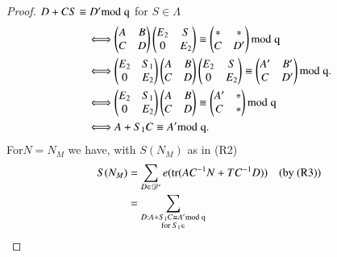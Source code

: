 \begin{proof}
$D+CS\equiv D'\rm{mod} \; q$ for $S\in\Lambda$
\begin{align*}
&\Longleftrightarrow 
\begin{pmatrix}
A & B\\
C & D
\end{pmatrix}
\begin{pmatrix}
E_{2} & S\\
0 & E_{2}
\end{pmatrix}
\equiv 
\begin{pmatrix}
\ast & \ast\\
C & D'
\end{pmatrix}
\rm{mod} \; q\\
&\Longleftrightarrow 
\begin{pmatrix}
E_{2} & S_{1}\\
0 & E_{2}
\end{pmatrix}
\begin{pmatrix}
A & B\\
C & D
\end{pmatrix}
\begin{pmatrix}
E_{2} & S\\
0 & E_{2}
\end{pmatrix}
\equiv 
\begin{pmatrix}
A' & B'\\
C & D'
\end{pmatrix}
\rm{mod} \; q.\\
&\Longleftrightarrow 
\begin{pmatrix}
E_{2} & S_{1}\\
0 & E_{2}
\end{pmatrix}
\begin{pmatrix}
A & B\\
C & D
\end{pmatrix}
\equiv
\begin{pmatrix}
A' & \ast\\
C & \ast
\end{pmatrix}
\rm{mod} \; q\\
&\Longleftrightarrow A+S_{1}C\equiv A'\rm{mod} \; q.
\end{align*}
For\pageoriginale $N=N_{M}$ we have, with $S(N_{M})$ as in (R2)
{\fontsize{10}{12}\selectfont
\begin{align*}
S(N_{M}) &=
\sum_{D\in\mathscr{D}'}e(\operatorname{tr}(AC^{-1}N+TC^{-1}D))\quad\text{(by
  (R3))}\\
&= \sum_{\substack{D:A+S_{1}C\equiv A'\rm{mod} \; q\\ \text{for } S_{1}\in
}}
\end{align*}}
\end{proof}
